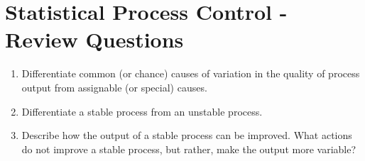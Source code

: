 \documentclass[12pt]{article}
\begin{document}
\section*{Statistical Process Control - Review Questions}

\begin{enumerate}

\item Differentiate common (or chance) causes of variation in the quality of process output from assignable (or special) causes.

\item  Differentiate a stable process from an unstable process.

\item  Describe how the output of a stable process can be improved. What actions do not improve a stable process, but rather, make the output more variable?

\end{enumerate}
\end{document}
